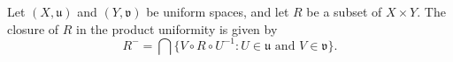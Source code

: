 \begin{proposition}
Let $(X, \mathfrak{u})$ and $(Y, \mathfrak{v})$ be uniform spaces, and let $R$ be a subset of $X \times Y$. The closure of $R$ in the product uniformity is given by
\[
R^{-} = \bigcap \{V \circ R \circ U^{-1} : U \in \mathfrak{u} \text{ and } V \in \mathfrak{v}\}.
\]
\end{proposition}

